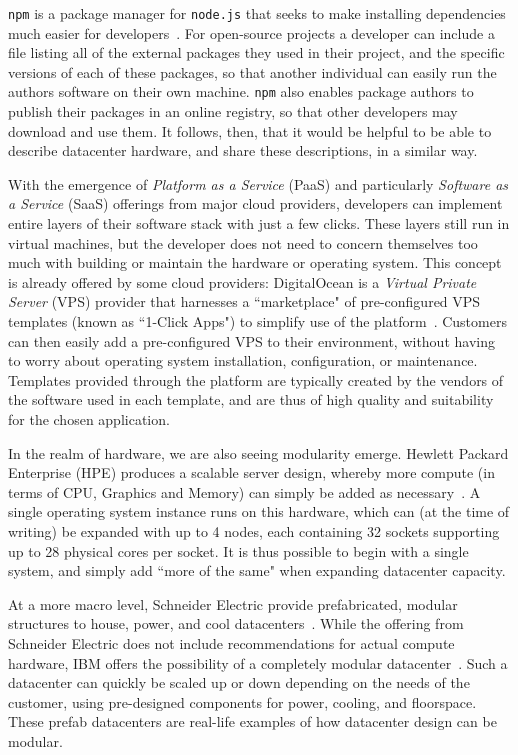 \documentclass[11pt]{article}
\begin{document}
		\verb|npm| is a package manager for \verb|node.js| that seeks to make installing dependencies much easier for developers~\cite{Wittern2016}.
		For open-source projects a developer can include a file listing all of the external packages they used in their project, and the specific versions of each of these packages, so that another individual can easily run the authors software on their own machine.
		\verb|npm| also enables package authors to publish their packages in an online registry, so that other developers may download and use them.
		It follows, then, that it would be helpful to be able to describe datacenter hardware, and share these descriptions, in a similar way. 

		With the emergence of \textit{Platform as a Service} (PaaS) and particularly \textit{Software as a Service} (SaaS) offerings from major cloud providers, developers can implement entire layers of their software stack with just a few clicks. 
		These layers still run in virtual machines, but the developer does not need to concern themselves too much with building or maintain the hardware or operating system.
		This concept is already offered by some cloud providers: DigitalOcean is a \textit{Virtual Private Server} (VPS) provider that harnesses a ``marketplace" of pre-configured VPS templates (known as ``1-Click Apps") to simplify use of the platform~\cite{DigitalOcean2020}. 
		Customers can then easily add a pre-configured VPS to their environment, without having to worry about operating system installation, configuration, or maintenance. 
		Templates provided through the platform are typically created by the vendors of the software used in each template, and are thus of high quality and suitability for the chosen application.

		In the realm of hardware, we are also seeing modularity emerge. 
		Hewlett Packard Enterprise (HPE) produces a scalable server design, whereby more compute (in terms of CPU, Graphics and Memory) can simply be added as necessary~\cite{Bang2020}.
		A single operating system instance runs on this hardware, which can (at the time of writing) be expanded with up to 4 nodes, each containing 32 sockets supporting up to 28 physical cores per socket.
		It is thus possible to begin with a single system, and simply add ``more of the same" when expanding datacenter capacity.

		At a more macro level, Schneider Electric provide prefabricated, modular structures to house, power, and cool datacenters~\cite{Torell2014, Torell2017}.
		While the offering from Schneider Electric does not include recommendations for actual compute hardware, IBM offers the possibility of a completely modular datacenter~\cite{IBM2014}.
		Such a datacenter can quickly be scaled up or down depending on the needs of the customer, using pre-designed components for power, cooling, and floorspace. 
		These prefab datacenters are real-life examples of how datacenter design can be modular.
	
\end{document}

